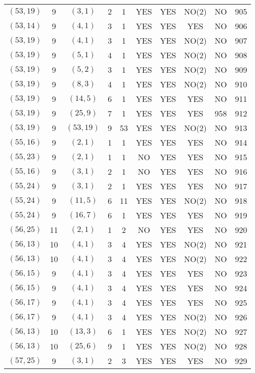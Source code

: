 \begin{longtable}{|c|c|c|c|c|c|c|c|c|c|}
$(53, 19)$ & 9 & $(3, 1)$ & 2 & 1 & YES & YES & NO(2) & NO & 905\\
$(53, 14)$ & 9 & $(4, 1)$ & 3 & 1 & YES & YES & YES & NO & 906\\
$(53, 19)$ & 9 & $(4, 1)$ & 3 & 1 & YES & YES & NO(2) & NO & 907\\
$(53, 19)$ & 9 & $(5, 1)$ & 4 & 1 & YES & YES & NO(2) & NO & 908\\
$(53, 19)$ & 9 & $(5, 2)$ & 3 & 1 & YES & YES & NO(2) & NO & 909\\
$(53, 19)$ & 9 & $(8, 3)$ & 4 & 1 & YES & YES & NO(2) & NO & 910\\
$(53, 19)$ & 9 & $(14, 5)$ & 6 & 1 & YES & YES & YES & NO & 911\\
$(53, 19)$ & 9 & $(25, 9)$ & 7 & 1 & YES & YES & YES & 958 & 912\\
$(53, 19)$ & 9 & $(53, 19)$ & 9 & 53 & YES & YES & NO(2) & NO & 913\\
$(55, 16)$ & 9 & $(2, 1)$ & 1 & 1 & YES & YES & YES & NO & 914\\
$(55, 23)$ & 9 & $(2, 1)$ & 1 & 1 & NO & YES & YES & NO & 915\\
$(55, 16)$ & 9 & $(3, 1)$ & 2 & 1 & NO & YES & YES & NO & 916\\
$(55, 24)$ & 9 & $(3, 1)$ & 2 & 1 & YES & YES & YES & NO & 917\\
$(55, 24)$ & 9 & $(11, 5)$ & 6 & 11 & YES & YES & NO(2) & NO & 918\\
$(55, 24)$ & 9 & $(16, 7)$ & 6 & 1 & YES & YES & YES & NO & 919\\
$(56, 25)$ & 11 & $(2, 1)$ & 1 & 2 & NO & YES & YES & NO & 920\\
$(56, 13)$ & 10 & $(4, 1)$ & 3 & 4 & YES & YES & NO(2) & NO & 921\\
$(56, 13)$ & 10 & $(4, 1)$ & 3 & 4 & YES & YES & NO(2) & NO & 922\\
$(56, 15)$ & 9 & $(4, 1)$ & 3 & 4 & YES & YES & YES & NO & 923\\
$(56, 15)$ & 9 & $(4, 1)$ & 3 & 4 & YES & YES & YES & NO & 924\\
$(56, 17)$ & 9 & $(4, 1)$ & 3 & 4 & YES & YES & YES & NO & 925\\
$(56, 17)$ & 9 & $(4, 1)$ & 3 & 4 & YES & YES & NO(2) & NO & 926\\
$(56, 13)$ & 10 & $(13, 3)$ & 6 & 1 & YES & YES & NO(2) & NO & 927\\
$(56, 13)$ & 10 & $(25, 6)$ & 9 & 1 & YES & YES & NO(2) & NO & 928\\
$(57, 25)$ & 9 & $(3, 1)$ & 2 & 3 & YES & YES & YES & NO & 929\\

\end{longtable}
